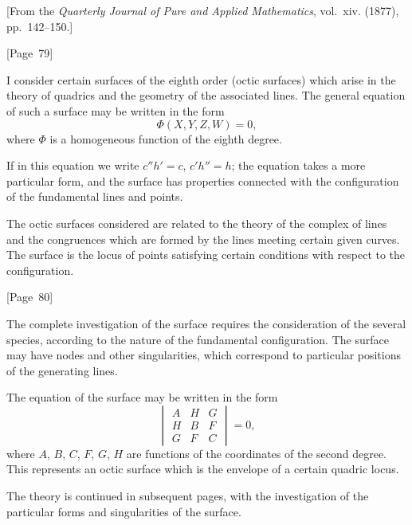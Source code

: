 \documentclass[11pt,a4paper]{book}
\begin{document}
[From the \textit{Quarterly Journal of Pure and Applied Mathematics},
vol.~xiv. (1877), pp.~142--150.]

\begin{center}
[Page~79]
\end{center}

I consider certain surfaces of the eighth order (octic surfaces)
which arise in the theory of quadrics and the geometry of the
associated lines. The general equation of such a surface may be
written in the form
\[
\Phi(X,Y,Z,W) = 0,
\]
where $\Phi$ is a homogeneous function of the eighth degree.

If in this equation we write $c''h' = c$, $c'h'' = h$; the equation
takes a more particular form, and the surface has properties connected
with the configuration of the fundamental lines and points.

The octic surfaces considered are related to the theory of the
complex of lines and the congruences which are formed by the lines
meeting certain given curves. The surface is the locus of points
satisfying certain conditions with respect to the configuration.

\begin{center}
[Page~80]
\end{center}

The complete investigation of the surface requires the consideration
of the several species, according to the nature of the fundamental
configuration. The surface may have nodes and other singularities,
which correspond to particular positions of the generating lines.

The equation of the surface may be written in the form
\[
\begin{vmatrix}
A & H & G \\
H & B & F \\
G & F & C
\end{vmatrix} = 0,
\]
where $A$, $B$, $C$, $F$, $G$, $H$ are functions of the coordinates of
the second degree. This represents an octic surface which is the
envelope of a certain quadric locus.

The theory is continued in subsequent pages, with the investigation
of the particular forms and singularities of the surface.
\clearpage
\end{document}
